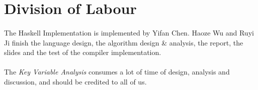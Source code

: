 \documentclass[a4paper]{article}
\begin{document}
\paragraph{}
\section{Division of Labour}
\paragraph{}
The Haskell Implementation is implemented by Yifan Chen. Haoze Wu and Ruyi Ji finish the language design, the algorithm design \& analysis, the report, the slides and the test of the compiler implementation.
\paragraph{}
The \emph{Key Variable Analysis} consumes a lot of time of design, analysis and discussion, and should be credited to all of us.
\end{document}
